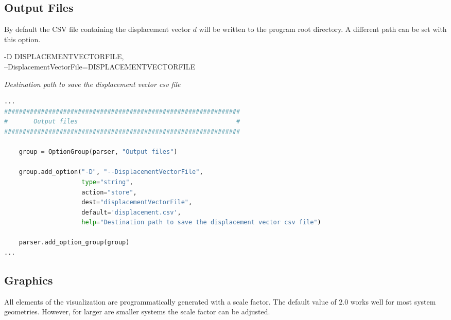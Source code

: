 \subsection{Output Files}
\label{subsec:outputFiles}

By default the CSV file containing the displacement vector $d$ will be written to the program root directory. A different path can be set with this option.

\vspace{2em}
\begin{addmargin}[2em]{1em}
-D DISPLACEMENTVECTORFILE,\\
--DisplacementVectorFile=DISPLACEMENTVECTORFILE 

\textit{Destination path to save the displacement vector csv file}
\end{addmargin}
\vspace{2em}

\begin{inconsolata}
\begin{minipage}{\linewidth}
\begin{lstlisting}[language=python]
...
################################################################
#       Output files                                           #
################################################################

    group = OptionGroup(parser, "Output files")

    group.add_option("-D", "--DisplacementVectorFile",
                     type="string",
                     action="store",
                     dest="displacementVectorFile",
                     default='displacement.csv',
                     help="Destination path to save the displacement vector csv file")

    parser.add_option_group(group)
...
\end{lstlisting}
\end{minipage}
\end{inconsolata}


\subsection{Graphics}
\label{subsec:graphics}

All elements of the visualization are programmatically generated with a scale factor. The default value of $2.0$ works well for most system geometries. However, for larger are smaller systems the scale factor can be adjusted.

